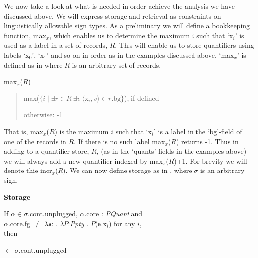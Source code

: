 We now take a look at what is needed in order achieve the analysis we
have discussed above.  We will express storage and retrieval as
constraints on linguistically allowable sign types.  As a preliminary
we will define a bookkeeping function, max$_x$, which enables us to determine
the maximum $i$ such that `x$_i$' is used as a label in a set of
records, $R$.  This will enable us to store quantifiers using labels
`x$_0$', `x$_1$' and so on in order as in the examples discussed
above. `max$_x$' is defined as in \nexteg{} where $R$ is an arbitrary
set of records.
\begin{ex} 
max$_x$($R$) = 
\begin{quote}
max($\{i\mid\exists r\in R\ \exists v\ \langle \mathrm{x}_i,v\rangle\in r.\mathrm{bg}\}$), if
defined

otherwise: -1 
\end{quote}
\end{ex}
That is, max$_x$($R$) is the maximum $i$ such that `x$_i$' is a label
in the `bg'-field of one of the records in $R$.  If there is no such label max$_x$($R$)
returns -1. Thus in adding to a quantifier store, $R$, (as in the
`quants'-fields in the examples above) we will always add a new
quantifier indexed by max$_x$($R$)+1.  For brevity we will denote thie
incr$_x$($R$).  We can now define storage as in
\nexteg{}, where $\sigma$ is an arbitrary sign.
\begin{ex} 
\textbf{Storage}

If $\alpha\in\sigma$.cont.unplugged, $\alpha$.core : \textit{PQuant}
and \\ $\alpha$.core.fg $\not=$
$\lambda\mathfrak{s}$:
  . $\lambda P$:\textit{Ppty} . $P$($\mathfrak{s}$.x$_i$) for any $i$, \\then

\hspace*{1em}

\hspace*{4em}$\in$ $\sigma$.cont.unplugged
                                 
\end{ex} 
